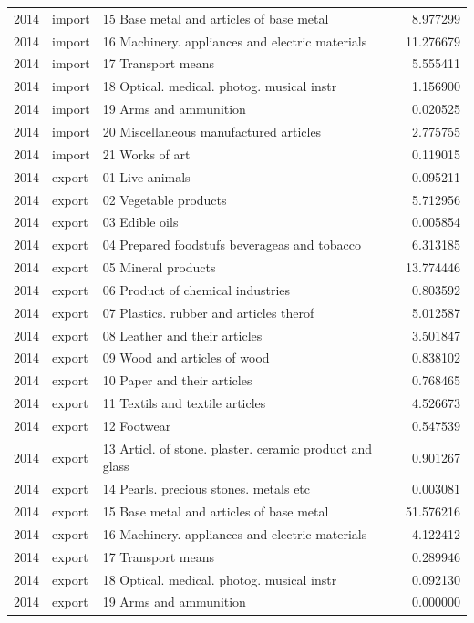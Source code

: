 \begin{tabular}{rllr}
2014 & import & 15 Base metal and articles of base metal & 8.977299 \\
2014 & import & 16 Machinery. appliances and electric materials & 11.276679 \\
2014 & import & 17 Transport means & 5.555411 \\
2014 & import & 18 Optical. medical. photog. musical instr & 1.156900 \\
2014 & import & 19 Arms and ammunition & 0.020525 \\
2014 & import & 20 Miscellaneous manufactured articles & 2.775755 \\
2014 & import & 21 Works of art & 0.119015 \\
2014 & export & 01 Live animals & 0.095211 \\
2014 & export & 02 Vegetable products & 5.712956 \\
2014 & export & 03 Edible oils & 0.005854 \\
2014 & export & 04 Prepared foodstufs beverageas and tobacco & 6.313185 \\
2014 & export & 05 Mineral products & 13.774446 \\
2014 & export & 06 Product of chemical industries & 0.803592 \\
2014 & export & 07 Plastics. rubber and articles therof & 5.012587 \\
2014 & export & 08 Leather and their articles & 3.501847 \\
2014 & export & 09 Wood and articles of wood & 0.838102 \\
2014 & export & 10 Paper and their articles & 0.768465 \\
2014 & export & 11 Textils and textile articles & 4.526673 \\
2014 & export & 12 Footwear & 0.547539 \\
2014 & export & 13 Articl. of stone. plaster. ceramic product and glass & 0.901267 \\
2014 & export & 14 Pearls. precious stones. metals etc & 0.003081 \\
2014 & export & 15 Base metal and articles of base metal & 51.576216 \\
2014 & export & 16 Machinery. appliances and electric materials & 4.122412 \\
2014 & export & 17 Transport means & 0.289946 \\
2014 & export & 18 Optical. medical. photog. musical instr & 0.092130 \\
2014 & export & 19 Arms and ammunition & 0.000000 \\

\end{tabular}
